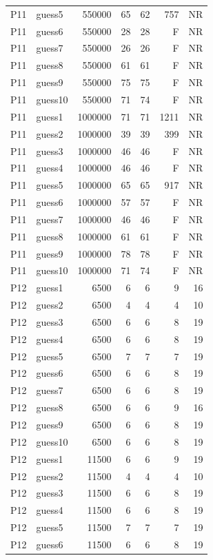 {\begin{longtable}{llrrrrr}
P11 & guess5 & 550000 & 65 & 62 & 757 & NR \\
P11 & guess6 & 550000 & 28 & 28 & F & NR \\
P11 & guess7 & 550000 & 26 & 26 & F & NR \\
P11 & guess8 & 550000 & 61 & 61 & F & NR \\
P11 & guess9 & 550000 & 75 & 75 & F & NR \\
P11 & guess10 & 550000 & 71 & 74 & F & NR \\
P11 & guess1 & 1000000 & 71 & 71 & 1211 & NR \\
P11 & guess2 & 1000000 & 39 & 39 & 399 & NR \\
P11 & guess3 & 1000000 & 46 & 46 & F & NR \\
P11 & guess4 & 1000000 & 46 & 46 & F & NR \\
P11 & guess5 & 1000000 & 65 & 65 & 917 & NR \\
P11 & guess6 & 1000000 & 57 & 57 & F & NR \\
P11 & guess7 & 1000000 & 46 & 46 & F & NR \\
P11 & guess8 & 1000000 & 61 & 61 & F & NR \\
P11 & guess9 & 1000000 & 78 & 78 & F & NR \\
P11 & guess10 & 1000000 & 71 & 74 & F & NR \\
P12 & guess1 & 6500 & 6 & 6 & 9 & 16 \\
P12 & guess2 & 6500 & 4 & 4 & 4 & 10 \\
P12 & guess3 & 6500 & 6 & 6 & 8 & 19 \\
P12 & guess4 & 6500 & 6 & 6 & 8 & 19 \\
P12 & guess5 & 6500 & 7 & 7 & 7 & 19 \\
P12 & guess6 & 6500 & 6 & 6 & 8 & 19 \\
P12 & guess7 & 6500 & 6 & 6 & 8 & 19 \\
P12 & guess8 & 6500 & 6 & 6 & 9 & 16 \\
P12 & guess9 & 6500 & 6 & 6 & 8 & 19 \\
P12 & guess10 & 6500 & 6 & 6 & 8 & 19 \\
P12 & guess1 & 11500 & 6 & 6 & 9 & 19 \\
P12 & guess2 & 11500 & 4 & 4 & 4 & 10 \\
P12 & guess3 & 11500 & 6 & 6 & 8 & 19 \\
P12 & guess4 & 11500 & 6 & 6 & 8 & 19 \\
P12 & guess5 & 11500 & 7 & 7 & 7 & 19 \\
P12 & guess6 & 11500 & 6 & 6 & 8 & 19 \\

\end{longtable}}
